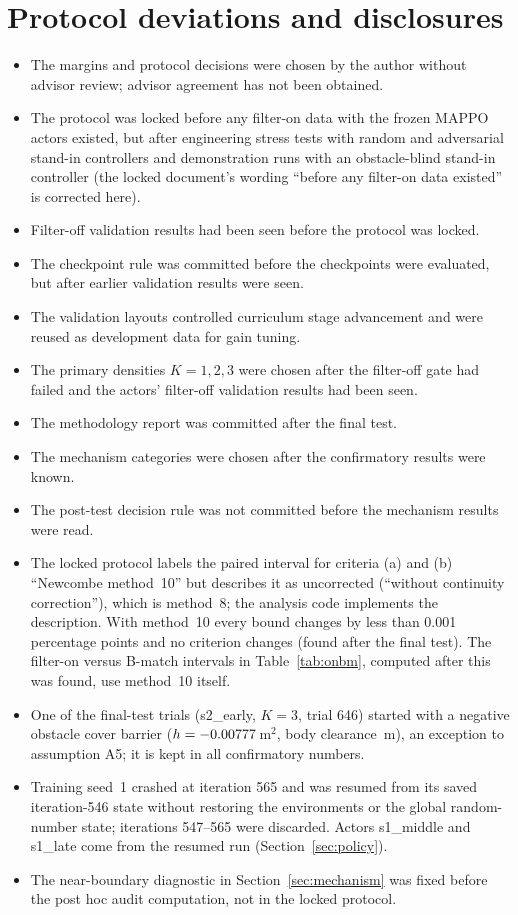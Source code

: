 \documentclass[11pt]{article}
\begin{document}
\section{Protocol deviations and disclosures}\label{sec:disclosures}
\begin{itemize}
\item The margins and protocol decisions were chosen by the author without advisor review; advisor agreement has not been obtained.
\item The protocol was locked before any filter-on data with the frozen MAPPO actors existed, but after engineering stress tests with random and adversarial stand-in controllers and demonstration runs with an obstacle-blind stand-in controller (the locked document's wording ``before any filter-on data existed'' is corrected here).
\item Filter-off validation results had been seen before the protocol was locked.
\item The checkpoint rule was committed before the checkpoints were evaluated, but after earlier validation results were seen.
\item The validation layouts controlled curriculum stage advancement and were reused as development data for gain tuning.
\item The primary densities $K=1,2,3$ were chosen after the filter-off gate had failed and the actors' filter-off validation results had been seen.
\item The methodology report was committed after the final test.
\item The mechanism categories were chosen after the confirmatory results were known.
\item The post-test decision rule was not committed before the mechanism results were read.
\item The locked protocol labels the paired interval for criteria (a) and (b) ``Newcombe method~10'' but describes it as uncorrected (``without continuity correction''), which is method~8; the analysis code implements the description. With method~10 every bound changes by less than 0.001 percentage points and no criterion changes (found after the final test). The filter-on versus B-match intervals in Table~\ref{tab:onbm}, computed after this was found, use method~10 itself.
\item One of the \TrialsTotal{} final-test trials (s2\_early, $K=3$, trial 646) started with a negative obstacle cover barrier ($h=-0.00777$\,m$^2$, body clearance \AfiveGap\,m), an exception to assumption A5; it is kept in all confirmatory numbers.
\item Training seed~1 crashed at iteration 565 and was resumed from its saved iteration-546 state without restoring the environments or the global random-number state; iterations 547--565 were discarded. Actors s1\_middle and s1\_late come from the resumed run (Section~\ref{sec:policy}).

\item The near-boundary diagnostic in Section~\ref{sec:mechanism} was fixed before the post hoc audit computation, not in the locked protocol.

\end{itemize}
\end{document}
